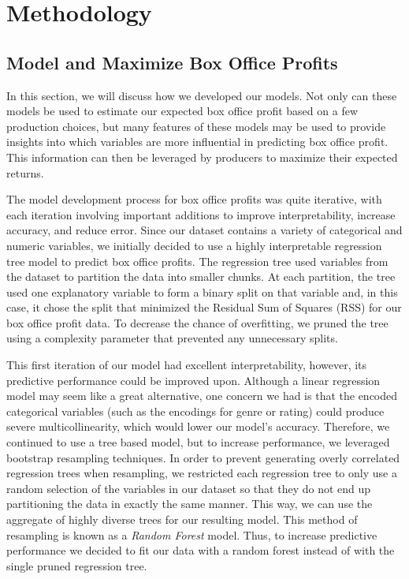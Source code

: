 \documentclass[10pt]{article}
\begin{document}
\section{Methodology}

\subsection{Model and Maximize Box Office Profits}

In this section, we will discuss how we developed our models. Not only can these models be used to estimate our expected box office profit based on a few production choices, but many features of these models may be used to provide insights into which variables are more influential in predicting box office profit. This information can then be leveraged by producers to maximize their expected returns.

The model development process for box office profits was quite iterative, with each iteration involving important additions to improve interpretability, increase accuracy, and reduce error. Since our dataset contains a variety of categorical and numeric variables, we initially decided to use a highly interpretable regression tree model to predict box office profits. The regression tree used variables from the dataset to partition the data into smaller chunks. At each partition, the tree used one explanatory variable to form a binary split on that variable and, in this case, it chose the split that minimized the Residual Sum of Squares (RSS) for our box office profit data. To decrease the chance of overfitting, we pruned the tree using a complexity parameter that prevented any unnecessary splits. 

This first iteration of our model had excellent interpretability, however, its predictive performance could be improved upon. Although a linear regression model may seem like a great alternative, one concern we had is that the encoded categorical variables (such as the encodings for genre or rating) could produce severe multicollinearity, which would lower our model’s accuracy. Therefore, we continued to use a tree based model, but to increase performance, we leveraged bootstrap resampling techniques. In order to prevent generating overly correlated regression trees when resampling, we restricted each regression tree to only use a random selection of the variables in our dataset so that they do not end up partitioning the data in exactly the same manner. This way, we can use the aggregate of highly diverse trees for our resulting model. This method of resampling is known as a \textit{Random Forest} model. Thus, to increase predictive performance we decided to fit our data with a random forest instead of with the single pruned regression tree. 
\end{document}
